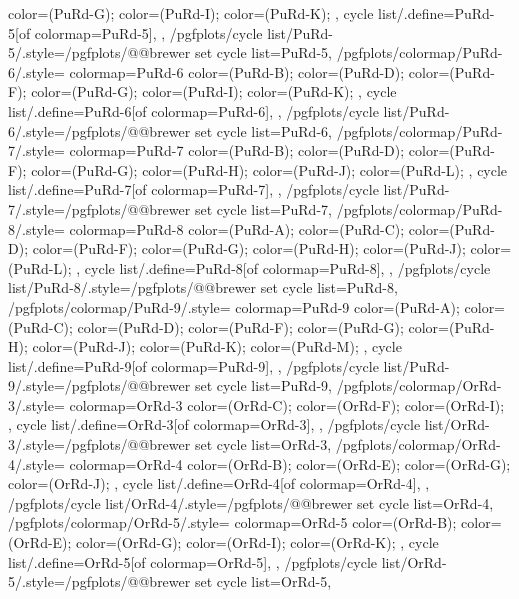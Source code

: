 {{{      color=(PuRd-G);
      color=(PuRd-I);
      color=(PuRd-K);
    },
    cycle list/.define={PuRd-5}{[of colormap=PuRd-5]},
  },
  /pgfplots/cycle list/PuRd-5/.style={/pgfplots/@@brewer set cycle list={PuRd-5}},
  /pgfplots/colormap/PuRd-6/.style={
    colormap={PuRd-6}{
      color=(PuRd-B);
      color=(PuRd-D);
      color=(PuRd-F);
      color=(PuRd-G);
      color=(PuRd-I);
      color=(PuRd-K);
    },
    cycle list/.define={PuRd-6}{[of colormap=PuRd-6]},
  },
  /pgfplots/cycle list/PuRd-6/.style={/pgfplots/@@brewer set cycle list={PuRd-6}},
  /pgfplots/colormap/PuRd-7/.style={
    colormap={PuRd-7}{
      color=(PuRd-B);
      color=(PuRd-D);
      color=(PuRd-F);
      color=(PuRd-G);
      color=(PuRd-H);
      color=(PuRd-J);
      color=(PuRd-L);
    },
    cycle list/.define={PuRd-7}{[of colormap=PuRd-7]},
  },
  /pgfplots/cycle list/PuRd-7/.style={/pgfplots/@@brewer set cycle list={PuRd-7}},
  /pgfplots/colormap/PuRd-8/.style={
    colormap={PuRd-8}{
      color=(PuRd-A);
      color=(PuRd-C);
      color=(PuRd-D);
      color=(PuRd-F);
      color=(PuRd-G);
      color=(PuRd-H);
      color=(PuRd-J);
      color=(PuRd-L);
    },
    cycle list/.define={PuRd-8}{[of colormap=PuRd-8]},
  },
  /pgfplots/cycle list/PuRd-8/.style={/pgfplots/@@brewer set cycle list={PuRd-8}},
  /pgfplots/colormap/PuRd-9/.style={
    colormap={PuRd-9}{
      color=(PuRd-A);
      color=(PuRd-C);
      color=(PuRd-D);
      color=(PuRd-F);
      color=(PuRd-G);
      color=(PuRd-H);
      color=(PuRd-J);
      color=(PuRd-K);
      color=(PuRd-M);
    },
    cycle list/.define={PuRd-9}{[of colormap=PuRd-9]},
  },
  /pgfplots/cycle list/PuRd-9/.style={/pgfplots/@@brewer set cycle list={PuRd-9}},
  /pgfplots/colormap/OrRd-3/.style={
    colormap={OrRd-3}{
      color=(OrRd-C);
      color=(OrRd-F);
      color=(OrRd-I);
    },
    cycle list/.define={OrRd-3}{[of colormap=OrRd-3]},
  },
  /pgfplots/cycle list/OrRd-3/.style={/pgfplots/@@brewer set cycle list={OrRd-3}},
  /pgfplots/colormap/OrRd-4/.style={
    colormap={OrRd-4}{
      color=(OrRd-B);
      color=(OrRd-E);
      color=(OrRd-G);
      color=(OrRd-J);
    },
    cycle list/.define={OrRd-4}{[of colormap=OrRd-4]},
  },
  /pgfplots/cycle list/OrRd-4/.style={/pgfplots/@@brewer set cycle list={OrRd-4}},
  /pgfplots/colormap/OrRd-5/.style={
    colormap={OrRd-5}{
      color=(OrRd-B);
      color=(OrRd-E);
      color=(OrRd-G);
      color=(OrRd-I);
      color=(OrRd-K);
    },
    cycle list/.define={OrRd-5}{[of colormap=OrRd-5]},
  },
  /pgfplots/cycle list/OrRd-5/.style={/pgfplots/@@brewer set cycle list={OrRd-5}},
}
